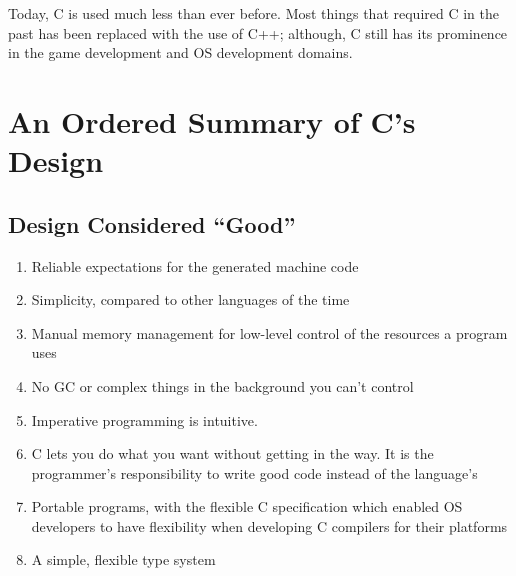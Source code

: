 \documentclass{article}
\begin{document}
    Today, C is used much less than ever before. Most things that required C in the past has been replaced with the use of C++; although, C still has its prominence in the game development and OS development domains.
    
    
    

\section{An Ordered Summary of C's Design}
\subsection*{Design Considered ``Good''}
    \begin{enumerate}
        \item Reliable expectations for the generated machine code
        \item Simplicity, compared to other languages of the time
        \item Manual memory management for low-level control of the resources a program uses
        \item No GC or complex things in the background you can't control
        \item Imperative programming is intuitive.
        \item C lets you do what you want without getting in the way. It is the programmer's responsibility to write good code instead of the language's 
        \item Portable programs, with the flexible C specification which enabled OS developers to have flexibility when developing C compilers for their platforms
        \item A simple, flexible type system
    \end{enumerate}
\end{document}
